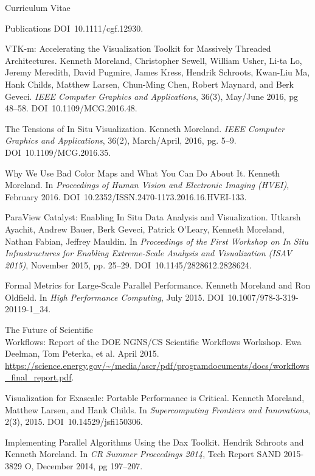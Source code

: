 \documentclass{article}
\begin{document}
\begin{cv}{Curriculum Vitae}
\begin{cvlist}{Publications}
      DOI~10.1111/cgf.12930.
    \item[VTK-m: Accelerating the Visualization Toolkit for Massively Threaded]~\\ Architectures.
      Kenneth Moreland, Christopher Sewell, William Usher, Li-ta Lo, Jeremy Meredith, David Pugmire, James Kress, Hendrik Schroots, Kwan-Liu Ma, Hank Childs, Matthew Larsen, Chun-Ming Chen, Robert Maynard, and Berk Geveci.
      \emph{IEEE Computer Graphics and Applications}, 36(3), May/June 2016, pg 48--58.
      DOI~10.1109/MCG.2016.48.
    \item[The Tensions of In Situ Visualization.]
      Kenneth Moreland.
      \emph{IEEE Computer Graphics and Applications}, 36(2), March/April, 2016, pg. 5--9.
      DOI~10.1109/MCG.2016.35.
    \item[Why We Use Bad Color Maps and What You Can Do About It.]
      Kenneth Moreland.
      In \emph{Proceedings of Human Vision and Electronic Imaging (HVEI)}, February 2016.
      DOI~10.2352/ISSN.2470-1173.2016.16.HVEI-133.
    \item[ParaView Catalyst: Enabling In Situ Data Analysis and Visualization.]
      Utkarsh Ayachit, Andrew Bauer, Berk Geveci, Patrick O'Leary, Kenneth Moreland, Nathan Fabian, Jeffrey Mauldin.
      In \emph{Proceedings of the First Workshop on In Situ Infrastructures for Enabling Extreme-Scale Analysis and Visualization (ISAV 2015)}, November 2015, pp. 25--29.
      DOI~10.1145/2828612.2828624.
    \item[Formal Metrics for Large-Scale Parallel Performance.]
      Kenneth Moreland and Ron Oldfield.
      In \emph{High Performance Computing}, July 2015.
      DOI~10.1007/978-3-319-20119-1\_34.
    \item[The Future of Scientific]~\\ Workflows: Report of the DOE NGNS/CS Scientific Workflows Workshop.
      Ewa Deelman, Tom Peterka, et al.
      April 2015.
      \url{https://science.energy.gov/~/media/ascr/pdf/programdocuments/docs/workflows_final_report.pdf}.
    \item[Visualization for Exascale: Portable Performance is Critical.]
      Kenneth Moreland, Matthew Larsen, and Hank Childs.
      In \emph{Supercomputing Frontiers and Innovations}, 2(3), 2015.
      DOI~10.14529/jsfi150306.
    \item[Implementing Parallel Algorithms Using the Dax Toolkit.]
      Hendrik Schroots and Kenneth Moreland.
      In \emph{CR Summer Proceedings 2014}, Tech Report SAND 2015-3829 O, December 2014, pg 197--207.

\end{cvlist}
\end{cv}
\end{document}
